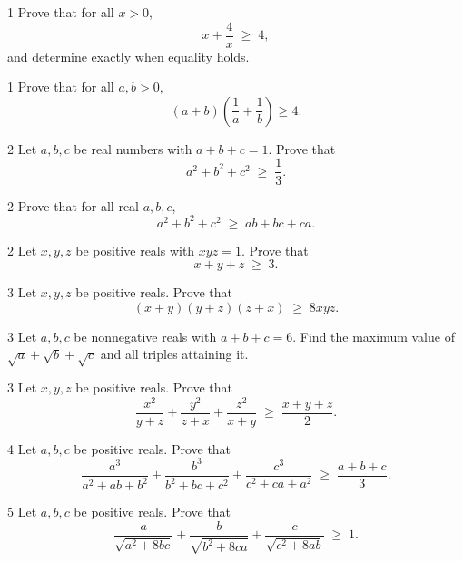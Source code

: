 
\begin{exercise}[label=ex:1-1]{1}
Prove that for all $x > 0$,
\[
  x + \frac{4}{x} \;\ge\; 4,
\]
and determine exactly when equality holds.
\end{exercise}

\begin{exercise}[label=ex:1-2]{1}
Prove that for all $a, b > 0$,
\[
  (a + b)\left( \frac{1}{a} + \frac{1}{b} \right) \ge 4 .
\]
\end{exercise}

\begin{exercise}[label=ex:1-3]{2}
Let $a, b, c$ be real numbers with $a + b + c = 1$. Prove that
\[
  a^2 + b^2 + c^2 \;\ge\; \frac{1}{3}.
\]
\end{exercise}

\begin{exercise}[label=ex:1-4]{2}
Prove that for all real $a, b, c$,
\[
  a^2 + b^2 + c^2 \;\ge\; ab + bc + ca .
\]
\end{exercise}

\begin{exercise}[label=ex:1-5]{2}
Let $x, y, z$ be positive reals with $xyz = 1$. Prove that
\[
  x + y + z \;\ge\; 3 .
\]
\end{exercise}

\begin{exercise}[label=ex:1-6]{3}
Let $x, y, z$ be positive reals. Prove that
\[
  (x + y)(y + z)(z + x) \;\ge\; 8xyz .
\]
\end{exercise}

\begin{exercise}[label=ex:1-7]{3}
Let $a, b, c$ be nonnegative reals with $a + b + c = 6$. Find the
maximum value of $\sqrt{a} + \sqrt{b} + \sqrt{c}$ and all triples
attaining it.
\end{exercise}

\begin{exercise}[label=ex:1-8]{3}
Let $x, y, z$ be positive reals. Prove that
\[
  \frac{x^2}{y+z} + \frac{y^2}{z+x} + \frac{z^2}{x+y}
  \;\ge\; \frac{x+y+z}{2}.
\]
\end{exercise}

\begin{challenge}[label=ch:1-1]{4}
Let $a, b, c$ be positive reals. Prove that
\[
  \frac{a^3}{a^2 + ab + b^2}
  + \frac{b^3}{b^2 + bc + c^2}
  + \frac{c^3}{c^2 + ca + a^2}
  \;\ge\; \frac{a+b+c}{3}.
\]
\end{challenge}

\begin{challenge}[label=ch:1-2]{5}
Let $a, b, c$ be positive reals. Prove that
\[
  \frac{a}{\sqrt{a^2 + 8bc}}
  + \frac{b}{\sqrt{b^2 + 8ca}}
  + \frac{c}{\sqrt{c^2 + 8ab}}
  \;\ge\; 1 .
\]
\end{challenge}
